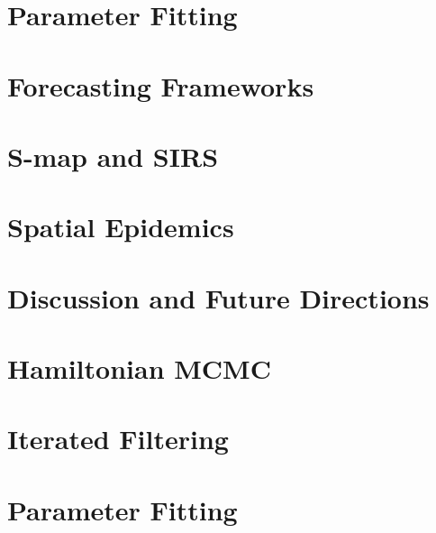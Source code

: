 \documentclass[12pt, twoside]{report}
\makeatletter
\let\org@subfile
\renewcommand*{}[1]{%
  \filename@parse{#1}%
  \expandafter
  \graphicspath\expandafter{\expandafter{\filename@area}}%
  \org@subfile{#1}%
}
\makeatother
\begin{document}
	\chapter{Parameter Fitting}

		\graphicspath{{../SC1/}}
		

	\chapter{Forecasting Frameworks}

		

	\chapter{S-map and SIRS}

		

	\chapter{Spatial Epidemics}

		

	\chapter{Discussion and Future Directions}

		
	


	\appendix

	\chapter{Hamiltonian MCMC}

		

	\chapter{Iterated Filtering}

		

	\chapter{Parameter Fitting}
\end{document}
